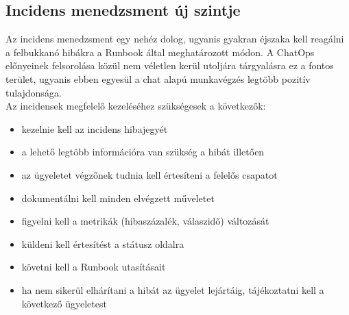 \subsection*{Incidens menedzsment új szintje}
Az incidens menedzsment egy nehéz dolog, ugyanis gyakran éjszaka kell reagálni a felbukkanó hibákra a Runbook által meghatározott módon. A ChatOps előnyeinek felsorolása közül nem véletlen kerül utoljára tárgyalásra ez a fontos terület, ugyanis ebben egyesül a chat alapú munkavégzés legtöbb pozitív tulajdonsága.\\
Az incidensek megfelelő kezeléséhez szükségesek a következők:
\begin{itemize}
  \item kezelnie kell az incidens hibajegyét
  \item a lehető legtöbb információra van szükség a hibát illetően
  \item az ügyeletet végzőnek tudnia kell értesíteni a felelős csapatot
  \item dokumentálni kell minden elvégzett műveletet
  \item figyelni kell a metrikák (hibaszázalék, válaszidő) változását
  \item küldeni kell értesítést a státusz oldalra
  \item követni kell a Runbook utasításait
  \item ha nem sikerül elhárítani a hibát az ügyelet lejártáig, tájékoztatni kell a következő ügyeletest
\end{itemize}


